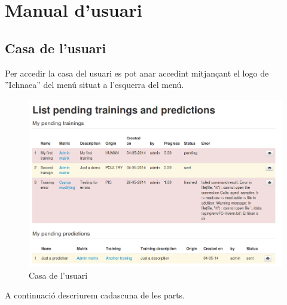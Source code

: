 \chapter{Manual d'usuari}
\label{cha:userguide}

\section{Casa de l'usuari}
\label{sec:home}
Per accedir la casa del usuari es pot anar accedint mitjançant el logo de ''Ichnaea'' del menú situat a l'esquerra del menú.

\begin{figure}[h!]
  \centering
  \includegraphics[scale=0.4]{img/userguide/dashboard.png}
  \caption{Casa de l'usuari}
  \label{fig:placement}
\end{figure}
A continuaci\'{o} descriurem cadascuna de les parts.

